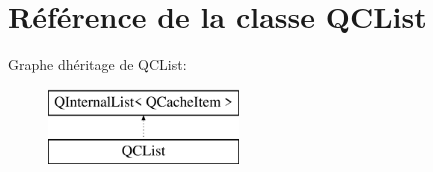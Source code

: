 \hypertarget{class_q_c_list}{}\section{Référence de la classe Q\+C\+List}
\label{class_q_c_list}
Graphe d\textquotesingle{}héritage de Q\+C\+List\+:\begin{figure}[H]
\begin{center}
\leavevmode
\includegraphics[height=2.000000cm]{class_q_c_list}
\end{center}
\end{figure}
